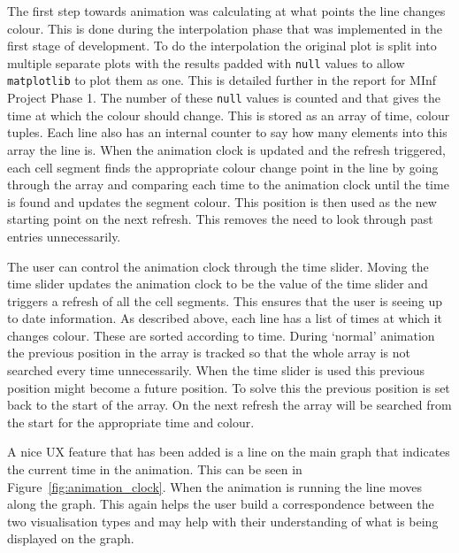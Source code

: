 The first step towards animation was calculating at what points the line changes colour.  This is done during the interpolation phase that was implemented in the first stage of development.  To do the interpolation the original plot is split into multiple separate plots with the results padded with \texttt{null} values to allow \texttt{matplotlib} to plot them as one.  This is detailed further in the report for MInf Project Phase 1.  The number of these \texttt{null} values is counted and that gives the time at which the colour should change.  This is stored as an array of time, colour tuples.  Each line also has an internal counter to say how many elements into this array the line is.  When the animation clock is updated and the refresh triggered, each cell segment finds the appropriate colour change point in the line by going through the array and comparing each time to the animation clock until the time is found and updates the segment colour.  This position is then used as the new starting point on the next refresh.  This removes the need to look through past entries unnecessarily.

The user can control the animation clock through the time slider.  Moving the time slider updates the animation clock to be the value of the time slider and triggers a refresh of all the cell segments. This ensures that the user is seeing up to date information.   As described above, each line has a list of times at which it changes colour.  These are sorted according to time.  During `normal' animation the previous position in the array is tracked so that the whole array is not searched every time unnecessarily.  When the time slider is used this previous position might become a future position.  To solve this the previous position is set back to the start of the array.  On the next refresh the array will be searched from the start for the appropriate time and colour.

A nice \ac{UX} feature that has been added is a line on the main graph that indicates the current time in the animation. This can be seen in Figure~\ref{fig:animation_clock}.  When the animation is running the line moves along the graph.  This again helps the user build a correspondence between the two visualisation types and may help with their understanding of what is being displayed on the graph.

